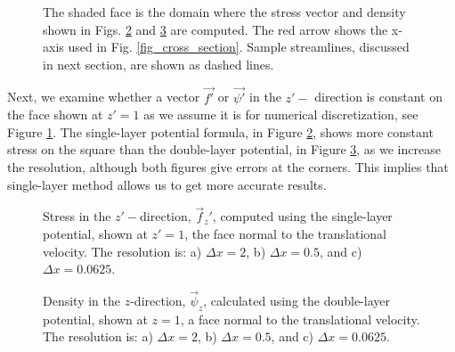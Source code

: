 %
%
\begin{figure}[ht]
	\begin{center}
		\vspace{0.00cm}
		
		\vspace{0.25cm}
	\end{center}
	\caption{The shaded face is the domain where the stress vector and density shown in Figs. \ref{fig_stress_cube8_32} and \ref{fig_density_cube8_32} are computed. The red arrow shows the x-axis used in Fig. \ref{fig_cross_section}. Sample streamlines, discussed in next section, are shown as dashed lines.}
	\label{fig_sample_cube}
\end{figure}
\par
Next, we examine whether a vector $\vec{f'}$ or $\vec{\psi'}$ in the $z'-$ direction is constant on the face shown at $z'=1$ as we assume it is for numerical discretization, see Figure \ref{fig_sample_cube}.
The single-layer potential formula, in Figure \ref{fig_stress_cube8_32}, shows more constant stress on the square than the double-layer potential, in Figure \ref{fig_density_cube8_32}, as we increase the resolution, although both figures give errors at the corners. This implies that single-layer method allows us to get more accurate results.
\begin{figure}[ht]
	\begin{center}
		\vspace{0.25cm}
		
		\vspace{0.2cm}
	\end{center}
	\caption{Stress in the $z'-$direction, $\vec{f}_z'$, computed using the single-layer potential, shown at $z'=1$, the face normal to the translational velocity. The resolution is: a) $\Delta x = 2$, b) $\Delta x = 0.5$, and c) $\Delta x =  0.0625$.}
	\label{fig_stress_cube8_32}
\end{figure}
\begin{figure}[h]
	\begin{center}
	\end{center}
	\caption{Density in the $z$-direction, $\vec{\psi}_z$,  calculated using the double-layer potential, shown at $z=1$, a face normal to the translational velocity. The resolution is: a) $\Delta x = 2$, b) $\Delta x = 0.5$, and c) $\Delta x =  0.0625$.}
	\label{fig_density_cube8_32}
\end{figure}
